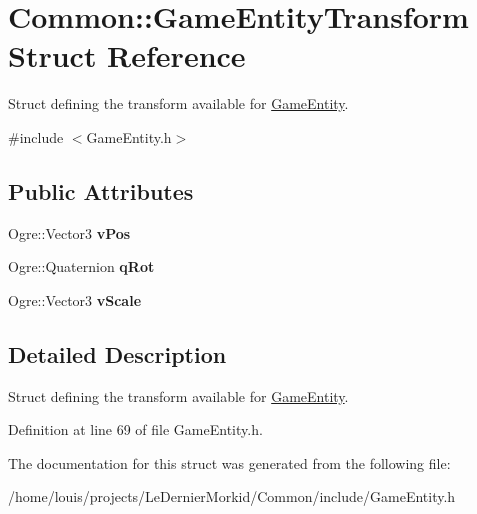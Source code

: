 \hypertarget{struct_common_1_1_game_entity_transform}{}\section{Common\+:\+:Game\+Entity\+Transform Struct Reference}
\label{struct_common_1_1_game_entity_transform}


Struct defining the transform available for \hyperlink{struct_common_1_1_game_entity}{Game\+Entity}.  




{\ttfamily \#include $<$Game\+Entity.\+h$>$}

\subsection*{Public Attributes}
\begin{DoxyCompactItemize}
\item 
\mbox{\label{struct_common_1_1_game_entity_transform_adb2f2de17915c25bb9d4c67d44fe0fd1}} 
Ogre\+::\+Vector3 {\bfseries v\+Pos}
\item 
\mbox{\label{struct_common_1_1_game_entity_transform_acd1fccda4d680b79073f5a6d7bb198d4}} 
Ogre\+::\+Quaternion {\bfseries q\+Rot}
\item 
\mbox{\label{struct_common_1_1_game_entity_transform_a47cc10b536e85e01efe0cd86185c4c0d}} 
Ogre\+::\+Vector3 {\bfseries v\+Scale}
\end{DoxyCompactItemize}


\subsection{Detailed Description}
Struct defining the transform available for \hyperlink{struct_common_1_1_game_entity}{Game\+Entity}. 

Definition at line 69 of file Game\+Entity.\+h.



The documentation for this struct was generated from the following file\+:\begin{DoxyCompactItemize}
\item 
/home/louis/projects/\+Le\+Dernier\+Morkid/\+Common/include/Game\+Entity.\+h\end{DoxyCompactItemize}
